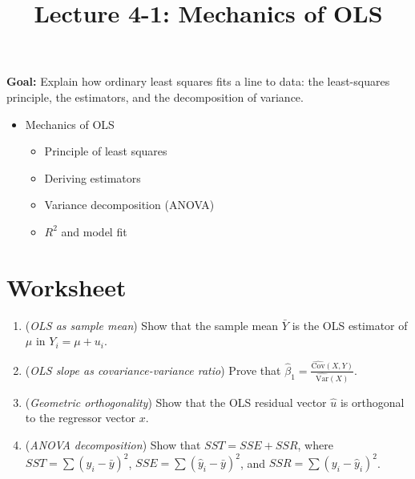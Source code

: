 \documentclass[12pt]{article}
\title{\Large Lecture 4-1: Mechanics of OLS}
\author{}
\date{}
\begin{document}
\maketitle
\vspace{-6em}

\noindent \textbf{Goal:} Explain how ordinary least squares fits a line to data: the least-squares principle, the estimators, and the decomposition of variance.\medskip

\begin{itemize}\setlength{\itemsep}{1em}
\item Mechanics of OLS
\begin{itemize}
\item Principle of least squares
\item Deriving estimators
\item Variance decomposition (ANOVA)
\item $R^2$ and model fit
\end{itemize}
\end{itemize}


\clearpage


\section*{Worksheet}


\begin{enumerate}\itemsep8em
\item (\emph{OLS as sample mean})  
Show that the sample mean $\bar{Y}$ is the OLS estimator of $\mu$ in $Y_i=\mu+u_i$.

\item (\emph{OLS slope as covariance-variance ratio})  
Prove that $\displaystyle \hat{\beta}_1=\frac{\widehat{\mathrm{Cov}}(X,Y)}{\widehat{\mathrm{Var}}(X)}$.

\item (\emph{Geometric orthogonality})  
Show that the OLS residual vector $\hat{u}$ is orthogonal to the regressor vector $x$.

\item (\emph{ANOVA decomposition})  
Show that $SST=SSE+SSR$, where $SST=\sum(y_i-\bar y)^2$, $SSE=\sum(\hat y_i-\bar y)^2$, and $SSR=\sum(y_i-\hat y_i)^2$.

\end{enumerate}
\end{document}
